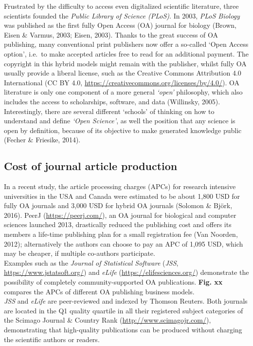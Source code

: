 \documentclass[10pt,fleqn]{wlpeerj}
\begin{document}
Frustrated
by
the
difficulty
to
access
even
digitalized
scientific
literature,
three
scientists
founded
the
\emph{Public
Library
of
Science
(PLoS)}.
In
2003,
\emph{PLoS
Biology}
was
published
as
the
first
fully
Open
Access
(OA)
journal
for
biology
(Brown,
Eisen
\&
Varmus,
2003;
Eisen,
2003).
Thanks
to
the
great
success
of OA
publishing,
many
conventional
print
publishers
now
offer
a
so-called
`Open
Access
option',
i.e.~to
make
accepted
articles
free
to
read
for
an
additional
payment.
The
copyright
in
this
hybrid
models
might
remain
with
the
publisher,
whilst
fully
OA
usually
provide
a
liberal
license,
such
as
the
Creative
Commons
Attribution
4.0
International
(CC
BY
4.0,
\url{https://creativecommons.org/licenses/by/4.0/}).
OA
literature
is
only
one
component
of a
more
general
\emph{`open'}
philosophy,
which
also
includes
the
access
to
scholarships,
software,
and
data
(Willinsky,
2005).
Interestingly,
there
are
several
different
`schools'
of
thinking
on
how
to
understand
and
define
\emph{`Open
Science'},
as
well
the
position
that
any
science
is
open
by
definition,
because
of
its
objective
to
make
generated
knowledge
public
(Fecher
\&
Friesike,
2014).

\subsection{Cost
of
journal
article
production}\label{cost-of-journal-article-production}

In a
recent
study,
the
article
processing
charges
(APCs)
for
research
intensive
universities
in
the
USA
and
Canada
were
estimated
to be
about
1,800
USD
for
fully
OA
journals
and
3,000
USD
for
hybrid
OA
journals
(Solomon
\&
Björk,
2016).
PeerJ
(\url{https://peerj.com/}),
an OA
journal
for
biological
and
computer
sciences
launched
2013,
drastically
reduced
the
publishing
cost
and
offers
its
members
a
life-time
publishing
plan
for a
small
registration
fee
(Van
Noorden,
2012);
alternatively
the
authors
can
choose
to
pay
an
APC
of
1,095
USD,
which
may
be
cheaper,
if
multiple
co-authors
participate.\\
Examples
such
as
the
\emph{Journal
of
Statistical
Software}
(\emph{JSS},
\url{https://www.jstatsoft.org/})
and
\emph{eLife}
(\url{https://elifesciences.org/})
demonstrate
the
possibility
of
completely
community-supported
OA
publications.
\textbf{Fig.
xx}
compares
the
APCs
of
different
OA
publishing
business
models.\\
\emph{JSS}
and
\emph{eLife}
are
peer-reviewed
and
indexed
by
Thomson
Reuters.
Both
journals
are
located
in
the
Q1
quality
quartile
in
all
their
registered
subject
categories
of
the
Scimago
Journal
\&
Country
Rank
(\url{http://www.scimagojr.com/}),
demonstrating
that
high-quality
publications
can
be
produced
without
charging
the
scientific
authors
or
readers.
\end{document}

